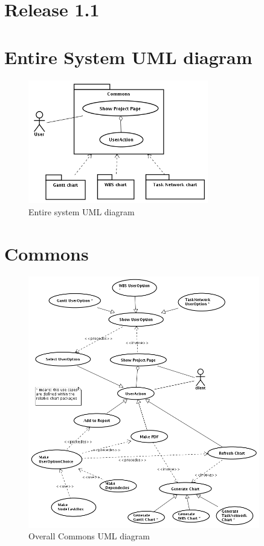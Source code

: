 \chapter*{Release \textbf{1.1}}

\chapter{Entire System UML diagram}
\begin{figure}[h!] \centering
\includegraphics[width=0.7\textwidth]{../Milestone2-UseCases/EntireSystem.png} 
\caption{Entire system UML diagram}
\label{fig:entireSystemDiagram}
\end{figure}

\chapter{Commons}
\begin{figure}[h!] \centering
\includegraphics[width=0.9\textwidth]{../Milestone2-UseCases/Commons/img/Overall.png}
\caption{Overall Commons UML diagram}
\label{fig:commonsOverallDiagram}
\end{figure}

